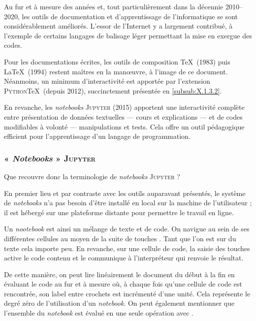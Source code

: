 Au fur et à mesure des années et, tout particulièrement dans la dé\-cennie 2010--2020, les outils de documentation et d'apprentissage de l'informatique se sont considérablement améliorés. L’essor de l'Internet y a largement contribué, à l'exemple de certains langages de balisage léger permettant la mise en exergue des codes.

Pour les documentations écrites, les outils de composition \TeX\ (1983) puis \LaTeX\ (1994) restent maîtres en la manœuvre, à l'image de ce document. Néanmoins, un minimum d'interactivité est apportée par l'extension \textsc{Python}\TeX\ (depuis 2012), succinctement présentée en \cref{subsub:X.1.3.2}.

En revanche, les \textit{notebooks} \textsc{Jupyter} (2015) apportent une interactivité complète entre présentation de données textuelles --- cours et explications --- et de codes modifiables à volonté --- manipulations et tests. Cela offre un outil pédagogique efficient pour l'apprentissage d'un langage de programmation.



\subsubsection[« \textit{Notebooks} » \textsc{Jupyter}]{« \textit{Notebooks} » \textsc{Jupyter}}
\label{subsub:X.1.3.1}

%
Que recouvre donc la terminologie de \textit{notebooks} \textsc{Jupyter} ? 

En premier lieu et par contraste avec les outils auparavant présentés, le système de \textit{notebooks} n'a pas besoin d'être installé en local sur la machine de l'utilisateur ; il est hébergé sur une plateforme distante pour permettre le travail en ligne.

Un \textit{nootebook} est ainsi un mélange de texte et de code. On navigue au sein de ses différentes cellules au moyen de la suite de touches . Tant que l'on est sur du texte cela importe peu. En revanche, sur une cellule de code, la saisie des touches  active le code contenu et le communique à l'interpréteur qui renvoie le résultat.

De cette manière, on peut lire linéairement le document du début à la fin en évaluant le code au fur et à mesure où, à chaque fois qu'une cellule de code est rencontrée, son label entre crochets est incrémenté d'une unité. Cela représente le degré zéro de l'utilisation d'un \textit{notebook}. On peut également mentionner que l'ensemble du \textit{notebook} est évalué en une seule opération avec .

